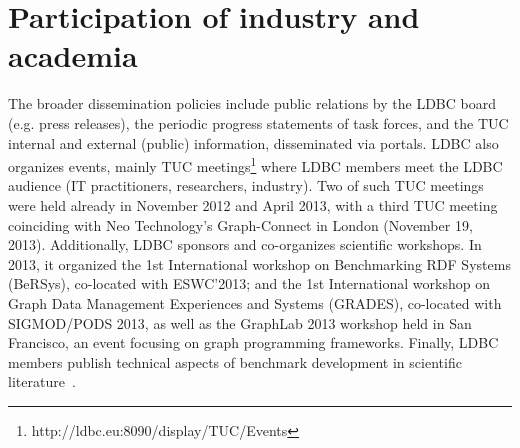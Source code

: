 

\section{Participation of industry and academia}


The broader dissemination policies include public relations by the LDBC
board (e.g. press releases), the periodic progress
statements of task forces, and the TUC internal
and external (public) information, disseminated via
portals. LDBC also organizes events, mainly TUC
meetings\footnote{http://ldbc.eu:8090/display/TUC/Events}
where LDBC members meet the LDBC
audience (IT practitioners, researchers, industry).
Two of such TUC meetings were held already in
November 2012 and April 2013, with a third TUC
meeting coinciding with Neo Technology's Graph-Connect in London (November 19, 2013).
Additionally, LDBC sponsors and co-organizes scientific
workshops. In 2013, it organized the 1st International
workshop on Benchmarking RDF Systems
(BeRSys), co-located with ESWC'2013; and the 1st
International workshop on Graph Data Management
Experiences and Systems (GRADES), co-located with
SIGMOD/PODS 2013, as well as the GraphLab
2013 workshop held in San Francisco, an event
focusing on graph programming frameworks. Finally,
LDBC members publish technical aspects of benchmark
development in scientific literature~\cite{angles2013benchmarking,boncz2013tpch,cattuto2013time,gubichev2013sparqling}.






